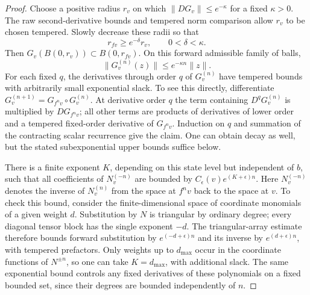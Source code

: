 \begin{proof}
Choose a positive radius $r_v$ on which
$\|DG_v\|\leq e^{-\kappa}$ for a fixed $\kappa>0$.
The raw second-derivative bounds and tempered norm comparison allow
$r_v$ to be chosen tempered.  Slowly decrease these radii so that
\[
 r_{fv}\geq e^{-\delta}r_v,\qquad 0<\delta<\kappa.
\]
Then $G_v(B(0,r_v))\subset B(0,r_{fv})$.  On this forward
admissible family of balls,
\begin{equation}\label{nf:raw-contraction}
 \|G_v^{(n)}(z)\|\leq e^{-\kappa n}\|z\|.
\end{equation}
For each fixed $q$, the derivatives through order $q$ of
$G_v^{(n)}$ have tempered bounds with arbitrarily small exponential
slack.  To see this directly, differentiate
$G_v^{(n+1)}=G_{f^nv}\circ G_v^{(n)}$.  At derivative order $q$ the
term containing $D^qG_v^{(n)}$ is multiplied by
$DG_{f^nv}$; all other terms are products of derivatives of lower
order and a tempered fixed-order derivative of $G_{f^nv}$.
Induction on $q$ and summation of the contracting scalar recurrence
give the claim.  One can obtain decay as well, but the stated
subexponential upper bounds suffice below.

There is a finite exponent $K$, depending on this state level but
independent of $b$, such that all coefficients of $N_v^{(-n)}$ are
bounded by $C_\epsilon(v)e^{(K+\epsilon)n}$.  Here $N_v^{(-n)}$
denotes the inverse of $N_v^{(n)}$ from the space at $f^nv$ back to
the space at $v$.  To check this bound, consider the finite-dimensional
space of coordinate monomials of a given weight $d$.  Substitution
by $N$ is triangular by ordinary degree; every diagonal tensor
block has the single exponent $-d$.  The triangular-array estimate
therefore bounds forward substitution by $e^{(-d+\epsilon)n}$ and
its inverse by $e^{(d+\epsilon)n}$, with tempered prefactors.
Only weights up to $d_{\max}$ occur in the coordinate functions of
$N^{\pm n}$, so one can take $K=d_{\max}$, with additional slack.
The same exponential bound controls any fixed derivatives of these
polynomials on a fixed bounded set, since their degrees are bounded
independently of $n$.


\end{proof}
